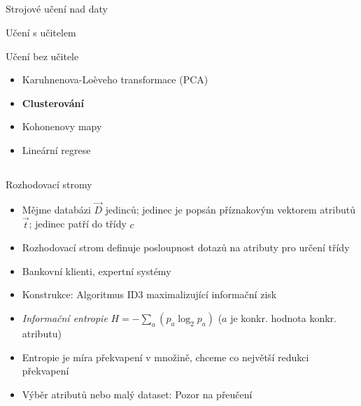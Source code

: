 \documentclass{beamer}
\begin{document}
\subsection{}
\begin{frame}{Strojové učení nad daty}
\begin{block}{Učení s učitelem}
\end{block}
\begin{block}{Učení bez učitele}
\begin{itemize}
\item Karuhnenova-Loèveho transformace (PCA)
\item {\bf Clusterování}
\item Kohonenovy mapy
\item Lineární regrese
\end{itemize}
\end{block}
\end{frame}

\subsection{}
\begin{frame}{Rozhodovací stromy}
\begin{itemize}
\item Mějme databázi $\vec D$ jedinců; jedinec je popsán příznakovým vektorem atributů $\vec t$; jedinec patří do třídy $c$
\item Rozhodovací strom definuje posloupnost dotazů na atributy pro určení třídy
\item Bankovní klienti, expertní systémy
\item Konstrukce: Algoritmus ID3 maximalizující informační zisk
\item {\em Informační entropie} $H = -\sum_a (p_a \log_2 p_a)$ ($a$ je konkr. hodnota konkr. atributu)
\item Entropie je míra překvapení v množině, chceme co největší redukci překvapení
\item Výběr atributů nebo malý dataset: Pozor na přeučení
\end{itemize}
\end{frame}
\end{document}
